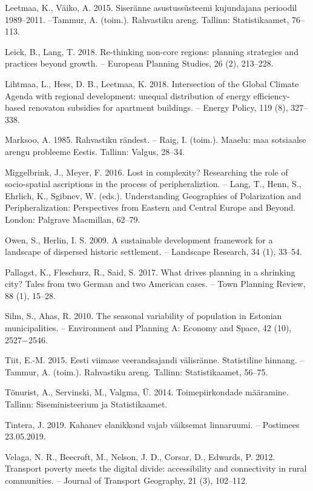\documentclass[estonian,]{article}
\begin{document}
Leetmaa, K., Väiko, A. 2015. Siseränne asustussüsteemi kujundajana perioodil 1989--2011. --Tammur, A. (toim.). Rahvastiku areng. Tallinn: Statistikaamet, 76--113.

Leick, B., Lang, T. 2018. Re-thinking non-core regions: planning strategies and practices beyond growth. -- European Planning Studies, 26 (2), 213--228.

Lihtmaa, L., Hess, D. B., Leetmaa, K. 2018. Intersection of the Global Climate Agenda with regional development: unequal distribution of energy efficiency-based renovaton subsidies for apartment buildings. -- Energy Policy, 119 (8), 327--338.

Marksoo, A. 1985. Rahvastiku rändest. -- Raig, I. (toim.). Maaelu: maa sotsiaalse arengu probleeme Eestis. Tallinn: Valgus, 28--34.

Miggelbrink, J., Meyer, F. 2016. Lost in complexity? Researching the role of socio-spatial ascriptions in the process of peripheraliztion. -- Lang, T., Henn, S., Ehrlich, K., Sgibnev, W. (eds.). Understanding Geographies of Polarization and Peripheralization: Perspectives from Eastern and Central Europe and Beyond. London: Palgrave Macmillan, 62--79.

Owen, S., Herlin, I. S. 2009. A sustainable development framework for a landscape of dispersed historic settlement. -- Landscape Research, 34 (1), 33--54.

Pallagst, K., Fleschurz, R., Said, S. 2017. What drives planning in a shrinking city? Tales from two German and two American cases. -- Town Planning Review, 88 (1), 15--28.

Silm, S., Ahas, R. 2010. The seasonal variability of population in Estonian municipalities. -- Environment and Planning A: Economy and Space, 42 (10), 2527−2546.

Tiit, E.-M. 2015. Eesti viimase veerandsajandi välisränne. Statistiline hinnang. -- Tammur, A. (toim.). Rahvastiku areng. Tallinn: Statistikaamet, 56--75.

Tõnurist, A., Servinski, M., Valgma, Ü. 2014. Toimepiirkondade määramine. Tallinn: Siseministeerium ja Statistikaamet.

Tintera, J. 2019. Kahanev elanikkond vajab väiksemat linnaruumi. -- Postimees 23.05.2019.

Velaga, N. R., Beecroft, M., Nelson, J. D., Corsar, D., Edwards, P. 2012. Transport poverty meets the digital divide: accessibility and connectivity in rural communities. -- Journal of Transport Geography, 21 (3), 102--112.
\end{document}
